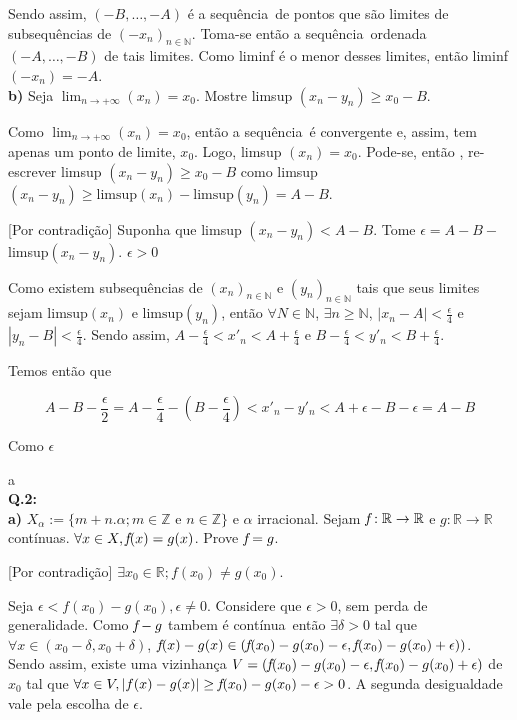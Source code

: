 \documentclass[12pt,twoside]{article}
\newcommand{\ent}{então }
\newcommand{\eh}{é }
\newcommand{\seq}{sequência}
\newcommand{\sao}{são }
\newcommand{\cont}{contínua}
\newcommand{\contradicao}{contradição}
\newcommand{\vizin}{vizinhança }
\newcommand{\limi}[2]{$\displaystyle{\lim_{n \to +\infty}}(#1)=#2$}
\newcommand{\f}{\mkern-2mu f\mkern-3mu}
\newcommand{\R}{\mathbb{R}}
\newcommand{\N}{\mathbb{N}}
\begin{document}
	Sendo assim, $(-B,\ldots,-A)$ \eh a \seq\ de pontos que \sao limites de sub\seq s de $(-x_n)_{n\in\mathbb{N}}$. Toma-se \ent a \seq\ ordenada $(-A,\ldots,-B)$ de tais limites. Como liminf \eh o menor desses limites, \ent \hbox{liminf$(-x_n) = -A$}.\\
	
	
	\noindent\textbf{b)} Seja \limi{x_n}{x_0}. Mostre limsup $(x_n - y_n) \ge x_0 - B$.
	
	Como \limi{x_n}{x_0}, \ent a \seq\ \eh convergente e, assim, tem apenas um ponto de limite, $x_0$. Logo, limsup $(x_n) = x_0$. Pode-se, \ent, re-escrever limsup $(x_n - y_n) \ge x_0 - B$ como limsup $(x_n - y_n) \ge \text{limsup}(x_n) - \text{limsup}(y_n) = A - B$.
	
	[Por \contradicao] Suponha que limsup $(x_n - y_n) < A - B$. Tome $\epsilon = A - B -$ limsup$(x_n - y_n)$. $\epsilon > 0$ 
	
	Como existem sub\seq s de $(x_n)_{n\in\N}$ e $(y_n)_{n\in\N}$ tais que seus limites sejam $\text{limsup}(x_n)$ e $\text{limsup}(y_n)$, \ent $\forall N \in \N$, $\exists n \ge \N$, $|x_n - A| < \frac{\epsilon}{4}$ e $|y_n - B| < \frac{\epsilon}{4}$. Sendo assim, $A - \frac{\epsilon}{4} < x'_n < A + \frac{\epsilon}{4}$ e $B - \frac{\epsilon}{4} < y'_n < B + \frac{\epsilon}{4}$.
	
	Temos \ent que
	
	$$
	A - B - \frac{\epsilon}{2} = A - \frac{\epsilon}{4} - (B - \frac{\epsilon}{4}) < x'_n - y'_n < A + \epsilon - B - \epsilon = A - B
	$$
	
	Como $\epsilon$
	
	a\\
	
	
	\noindent\textbf{Q.2:}\\
	
	
	\noindent\textbf{a)} $X_\alpha := \{m+n.\alpha; m\in\mathbb{Z} \text{ e }n \in\mathbb{Z}\}$ e $\alpha$ irracional.
	Sejam $\f :\R\rightarrow\R$ e $g: \R\rightarrow\R$ \cont s.
	$\forall x \in X, \f (x) = g(x)$. Prove $\f = g$.
	
	[Por \contradicao] $\exists x_0 \in \R; f(x_0) \neq g(x_0)$.
	
	Seja $\epsilon < f(x_0) - g(x_0), \epsilon \neq 0$. Considere que $\epsilon > 0$, sem perda de generalidade. Como $\f - g$ tambem \eh \cont\, \ent $\exists \delta > 0$ tal que $\forall x \in (x_0 - \delta, x_0 + \delta)$, $\f (x) - g(x) \in (\f (x_0) -g(x_0) - \epsilon, \f (x_0) -g(x_0) + \epsilon))$. Sendo assim, existe uma \vizin $V = (\f (x_0) -g(x_0) - \epsilon, \f (x_0) -g(x_0) + \epsilon)$ de $x_0$ tal que $\forall x \in V, |f(x) - g(x)| \ge \f (x_0) -g(x_0) - \epsilon > 0$. A segunda desigualdade vale pela escolha de $\epsilon$.
	
\end{document}
